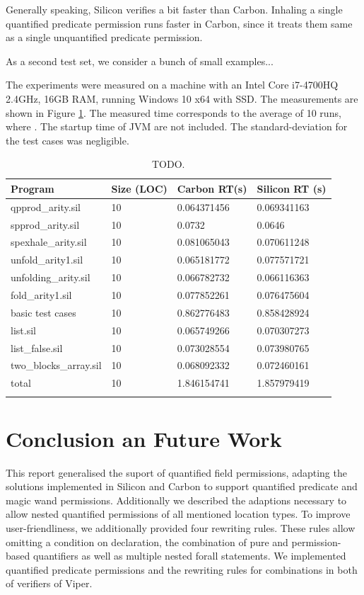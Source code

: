 \documentclass[12pt]{article}
\begin{document}
Generally speaking, Silicon verifies a bit faster than Carbon. Inhaling a single quantified predicate permission runs faster in Carbon, since it treats them same as a single unquantified predicate permission.

As a second test set, we consider a bunch of small examples...

The experiments were measured on a machine with an Intel Core i7-4700HQ 2.4GHz, 16GB RAM, running Windows 10 x64 with SSD. The measurements are shown in Figure \ref{timings}. The measured time corresponds to the average of 10 runs, where . The startup time of JVM are not included. The standard-deviation for the test cases was negligible.

\begin{longtable}{ | p{} | p{}| p{} | p{}|}
\hline
{\bf Program} & {\bf Size (LOC)} & {\bf Carbon RT(s) }&  {\bf Silicon RT (s)} \\ \hline
qpprod\_arity.sil & 10 & 0.064371456 & 0.069341163\\
spprod\_arity.sil & 10 & 0.0732 & 0.0646 \\
spexhale\_arity.sil & 10 & 0.081065043 & 0.070611248 \\
unfold\_arity1.sil & 10 & 0.065181772 & 0.077571721\\
unfolding\_arity.sil & 10 & 0.066782732 & 0.066116363\\
fold\_arity1.sil & 10 & 0.077852261 & 0.076475604 \\
\hline
basic test cases & 10 & 0.862776483 & 0.858428924
\\
\hline
list.sil & 10 & 0.065749266 & 0.070307273\\
list\_false.sil & 10 & 0.073028554 & 0.073980765\\
two\_blocks\_array.sil & 10 & 0.068092332 & 0.072460161\\
\hline \hline
total & 10 & 1.846154741 & 1.857979419\\
\hline
\caption[run-time measurements]
   {TODO.}
\label{timings}
\end{longtable}

\section{Conclusion an Future Work}
This report generalised the suport of quantified field permissions, adapting the solutions implemented in Silicon and Carbon to support quantified predicate and magic wand permissions. Additionally we described the adaptions necessary to allow nested quantified permissions of all mentioned location types. To improve user-friendliness, we additionally provided four rewriting rules. These rules allow omitting a condition on declaration, the combination of pure and permission-based quantifiers as well as multiple nested forall statements. We implemented quantified predicate permissions and the rewriting rules for combinations in both of verifiers of Viper.
\end{document}
